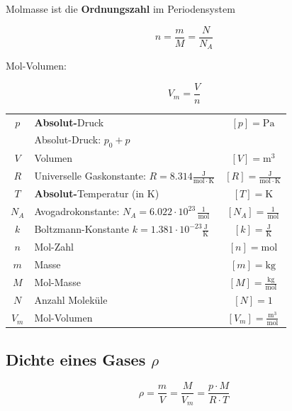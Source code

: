Molmasse ist die \textbf{Ordnungszahl} im Periodensystem

$$  \boxed{ n = \frac{m}{M} = \frac{N}{N_A} } $$


Mol-Volumen:

$$ \boxed{ V_m = \frac{V}{n} }$$



\begin{tabular}{c l c}
	$p$ & \textbf{Absolut-}Druck & $[p] = \mathrm{Pa}$ \\
	    & Absolut-Druck: $p_0 + p$ & \\
	$V$ & Volumen & $[V] = \mathrm{m^3}$ \\
	\rule{0pt}{8pt}$R$ & Universelle Gaskonstante: $R = 8.314 \mathrm{\frac{J}{mol \cdot K}}$ & $[R] = \mathrm{\frac{J}{mol \cdot K}} $ \\
	$T$ & \textbf{Absolut-}Temperatur (in K) & $[T] = \mathrm{K}$ \\
	\rule{0pt}{8pt}$N_A$ & 	Avogadrokonstante: $N_A = 6.022 \cdot 10^{23} \, \mathrm{\frac{1}{mol}} $ & $[N_A] =  \mathrm{\frac{1}{mol}}$  \\	
	\rule{0pt}{8pt}$k$ & Boltzmann-Konstante $k = 1.381 \cdot 10^{-23} \mathrm{\frac{J}{K}}$ & $[k] = \mathrm{\frac{J}{K}}$ \\	
	$n$ & Mol-Zahl & $[n] = \mathrm{mol}$ \\
	$m$ & Masse & $[m] = \mathrm{kg}$ \\
	\rule{0pt}{8pt}$M$ & Mol-Masse & $[M] = \mathrm{\frac{kg}{mol}}$ \\
	$N$ & Anzahl Moleküle & $[N] = 1$ \\
	\rule{0pt}{8pt}$V_m$ & Mol-Volumen & $[V_m] = \mathrm{\frac{m^3}{mol}}$ \\
\end{tabular}




\subsection{Dichte eines Gases $\rho$}

$$ \boxed{ \rho = \frac{m}{V} = \frac{M}{V_m} = \frac{p \cdot M}{R \cdot T} }$$


